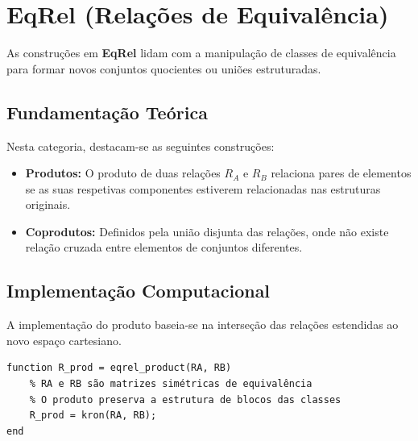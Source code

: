 \section{EqRel (Relações de Equivalência)}

As construções em \textbf{EqRel} lidam com a manipulação de classes de equivalência para formar novos conjuntos quocientes ou uniões estruturadas.

\subsection{Fundamentação Teórica}
Nesta categoria, destacam-se as seguintes construções:
\begin{itemize}
    \item \textbf{Produtos:} O produto de duas relações $R_A$ e $R_B$ relaciona pares de elementos se as suas respetivas componentes estiverem relacionadas nas estruturas originais.
    \item \textbf{Coprodutos:} Definidos pela união disjunta das relações, onde não existe relação cruzada entre elementos de conjuntos diferentes.
\end{itemize}

\subsection{Implementação Computacional}
A implementação do produto baseia-se na interseção das relações estendidas ao novo espaço cartesiano.

\begin{lstlisting}[caption={Produto de Relações de Equivalência}]
function R_prod = eqrel_product(RA, RB)
    % RA e RB são matrizes simétricas de equivalência
    % O produto preserva a estrutura de blocos das classes
    R_prod = kron(RA, RB); 
end
\end{lstlisting}